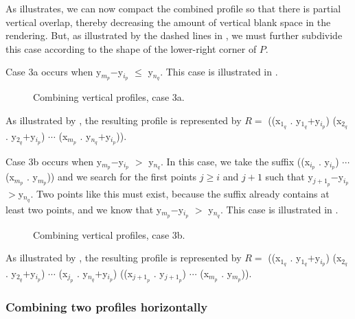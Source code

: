 As  illustrates, we can now
compact the combined profile so that there is partial vertical
overlap, thereby decreasing the amount of vertical blank space in the
rendering.  But, as illustrated by the dashed lines in
, we must further subdivide this
case according to the shape of the lower-right corner of $P$.

Case 3a occurs when y$_{m_p}$$-$y$_{i_p}$ $\le$ y$_{n_q}$.  This case is
illustrated in .

\begin{figure}
\begin{center}
\end{center}
\caption{\label{fig-profile-vertical-case-3a}
Combining vertical profiles, case 3a.}
\end{figure}

As illustrated by , the resulting
profile is represented by $R = $ ((x$_{1_q}$ . y$_{1_q}$$+$y$_{i_p}$)
(x$_{2_q}$ . y$_{2_q}$$+$y$_{i_p}$) $\cdots$ (x$_{m_p}$
. y$_{n_q}$$+$y$_{i_p}$)).

Case 3b occurs when y$_{m_p}$$-$y$_{i_p}$ $>$ y$_{n_q}$.  In this
case, we take the suffix ((x$_{i_p}$ . y$_{i_p}$) $\cdots$ (x$_{m_p}$
. y$_{m_p}$)) and we search for the first points $j\ge i$ and $j+1$ such
that y$_{{j+1}_p}$$-$y$_{i_p}$$>$y$_{n_q}$.  Two points like this must exist,
because the suffix already contains at least two points, and we know
that y$_{m_p}$$-$y$_{i_p}$ $>$ y$_{n_q}$.  This case is illustrated in
.

\begin{figure}
\begin{center}
\end{center}
\caption{\label{fig-profile-vertical-case-3b}
Combining vertical profiles, case 3b.}
\end{figure}

As illustrated by , the resulting
profile is represented by $R = $ ((x$_{1_q}$ . y$_{1_q}$$+$y$_{i_p}$)
(x$_{2_q}$ . y$_{2_q}$$+$y$_{i_p}$) $\cdots$ (x$_{j_p}$
. y$_{n_q}$$+$y$_{i_p}$) ((x$_{{j+1}_p}$ . y$_{{j+1}_p}$) $\cdots$
(x$_{m_p}$ . y$_{m_p}$)).

\subsubsection{Combining two profiles horizontally}

